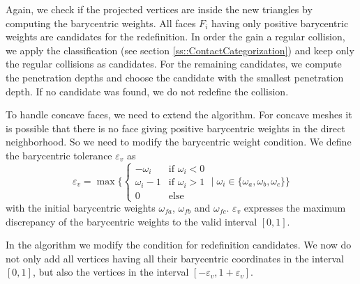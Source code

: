 Again, we check if the projected vertices are inside the new triangles by computing the barycentric weights.
All faces $F_i$ having only positive barycentric weights are candidates for the redefinition. In order the gain a regular collision, we apply the classification (see section \ref{ss::ContactCategorization}) and keep only the regular collisions as candidates. For the remaining candidates, we compute the penetration depths and choose the candidate with the smallest penetration depth. If no candidate was found, we do not redefine the collision.
 
To handle concave faces, we need to extend the algorithm.
For concave meshes it is possible that there is no face giving positive barycentric weights in the direct neighborhood. So we need to modify the barycentric weight condition. We define the barycentric tolerance $\varepsilon_v$ as
\begin{equation}
\varepsilon_v= \max\{
\begin{cases}
-\omega_i & \text{if } \omega_i<0 \\
\omega_i-1 &  \text{if } \omega_i>1\\
0&  \text{else}
\end{cases} \; | \; \omega_i \in \{\omega_a,\omega_b,\omega_c\}\}
\end{equation}
with the initial barycentric weights $\omega_{fa}$, $\omega_{fb}$ and $\omega_{fc}$.  $\varepsilon_v$ expresses the maximum discrepancy of the barycentric weights to the valid interval $[0,1]$.

In the algorithm we modify the condition for redefinition candidates. We now do not only add all vertices having all their barycentric coordinates in the interval $[0,1]$, but also the vertices in the interval $[-\varepsilon_v,1+\varepsilon_v]$.




